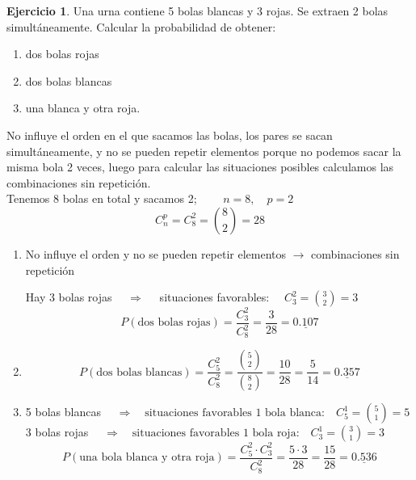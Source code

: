 \documentclass[a4paper, 12pt]{article}
\theoremstyle{definition}
\newtheorem{ej}{Ejercicio}
\begin{document}
\begin{ej}
Una urna contiene 5 bolas blancas y 3 rojas. Se extraen 2 bolas simultáneamente. Calcular la
probabilidad de obtener:
\begin{enumerate}[label=\textit{\alph*)}]
\item dos bolas rojas
\item dos bolas blancas
\item una blanca y otra roja.
\end{enumerate}

No influye el orden en el que sacamos las bolas, los pares se sacan simultáneamente, y no se pueden repetir elementos porque no podemos sacar la misma bola 2 veces, luego para calcular las situaciones posibles calculamos las combinaciones sin repetición. \\
Tenemos 8 bolas en total y sacamos 2; $\qquad n=8 , \quad p=2$
\[C^p_n = C^2_8 = \binom{8}{2} = 28\]
\begin{enumerate}[label=\textit{\alph*)}]
\item No influye el orden y no se pueden repetir elementos $\longrightarrow$ combinaciones sin repetición

Hay 3 bolas rojas $\quad\Longrightarrow\quad$ situaciones favorables: $\quad C_3^2 = \binom{3}{2} = 3$
\[P(\text{dos bolas rojas}) = \frac{C_3^2}{C_8^2} = \frac{3}{28} = \underline{0.107}\]
\item \[P(\text{dos bolas blancas}) = \frac{C_5^2}{C_8^2} = \frac{\binom{5}{2}}{\binom{8}{2}} = \frac{10}{28} = \frac{5}{14} = \underline{0.357}\]
\item 5 bolas blancas $\quad\Longrightarrow\quad \text{situaciones favorables 1 bola blanca:}\quad C_5^1 = \binom{5}{1} = 5$ \\
3 bolas rojas $\quad\Longrightarrow\quad \text{situaciones favorables 1 bola roja:}\quad C_3^1 = \binom{3}{1} = 3$
\[P(\text{una bola blanca y otra roja}) = \frac{C_5^2 \cdot C_3^2}{C_8^2} = \frac{5\cdot3}{28} = \frac{15}{28} = \underline{0.536}\]
\end{enumerate}

\end{ej}

\medskip
\end{document}
